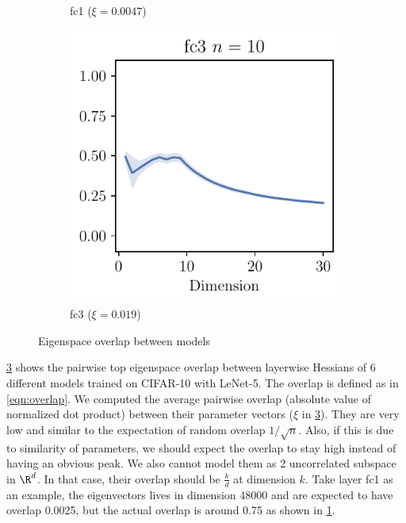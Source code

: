 \begin{figure}[th]
\begin{subfigure}[b]{0.32\textwidth}
        \caption{fc1 ($\xi =0.0047$)}
        \label{fig:Overlap_fc1}
    \end{subfigure}
    \begin{subfigure}[b]{0.32\textwidth}
        \centering
        \captionsetup{justification=centering}
        \includegraphics[width=\textwidth]{Figures/SubspaceOverlap/LeNet5_fixlr0.01/DimOverlap_CIFAR10_LeNet5_fixlr0.01_fc3.pdf}
        \caption{fc3 ($\xi =0.019$)}
        \label{fig:Overlap_fc3}
    \end{subfigure}
    \captionsetup{justification=centering}
    \caption{Eigenspace overlap between models}
    \label{fig:overlap}
\end{figure}

\cref{fig:overlap} shows the pairwise top eigenspace overlap between layerwise Hessians of 6 different models trained on CIFAR-10 with LeNet-5. The overlap is defined as in \cref{eqn:overlap}. We computed the average pairwise overlap (absolute value of normalized dot product) between their parameter vectors ($\xi$ in \cref{fig:overlap}). They are very low and similar to the expectation of random overlap $1/\sqrt{n}$. Also, if this is due to similarity of parameters, we should expect the overlap to stay high instead of having an obvious peak. We also cannot model them as 2 uncorrelated subspace in $\R^d$. In that case, their overlap should be $\frac{k}{d}$ at dimension $k$. Take layer fc1 as an example, the eigenvectors lives in dimension 48000 and are expected to have overlap 0.0025, but the actual overlap is around 0.75 as shown in \cref{fig:Overlap_fc1}.

